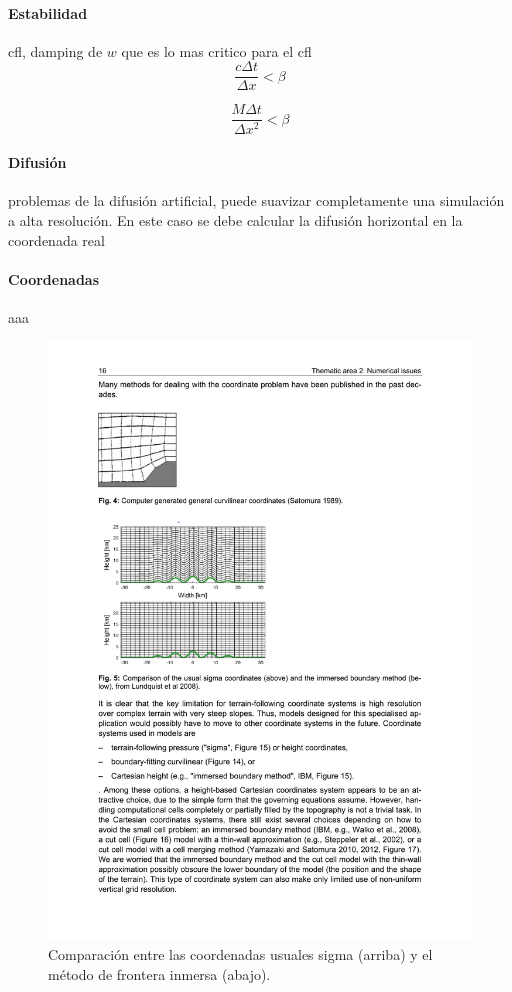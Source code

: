 \paragraph{Estabilidad} cfl, damping de $w$ que es lo mas critico para el cfl
\begin{equation}\label{eq:cfl}
\frac{c\Delta t}{\Delta x}<\beta
\end{equation}

\begin{equation}\label{eq:cfl_d}
\frac{M\Delta t}{\Delta x^2}<\beta
\end{equation}

\paragraph{Difusión} problemas de la difusión artificial, puede suavizar completamente una simulación a alta resolución. En este caso se debe calcular la difusión horizontal en la coordenada real

\paragraph{Coordenadas} aaa
 
\begin{figure}[h!]
	\centering
	\includegraphics[width=0.8\linewidth,trim={2.6cm 13.5cm 9.2cm 9cm},clip]{Imagenes/02/coordinates}
	\caption{Comparación entre las coordenadas usuales sigma (arriba) y el método de frontera inmersa (abajo).}
	\label{fig:02coordinates}
\end{figure}

